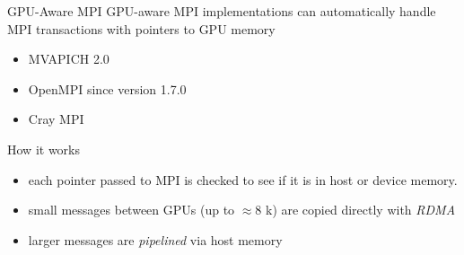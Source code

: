 \begin{frame}[fragile]{}
    \begin{info}{GPU-Aware MPI}
        GPU-aware MPI implementations can automatically handle MPI transactions with pointers to GPU memory
        \begin{itemize}
            \item MVAPICH 2.0
            \item OpenMPI since version 1.7.0
            \item Cray MPI
        \end{itemize}
    \end{info}

    \begin{info}{How it works}
        \begin{itemize}
        \item each pointer passed to MPI is checked to see if it is in host or device memory.
        \item small messages between GPUs (up to $\approx$8 k) are copied directly with \emph{RDMA}
            \item larger messages are \emph{pipelined} via host memory
        \end{itemize}
    \end{info}

\end{frame}

